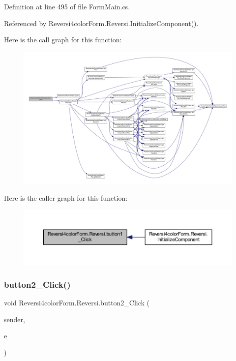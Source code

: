 Definition at line 495 of file Form\+Main.\+cs.



Referenced by Reversi4color\+Form.\+Reversi.\+Initialize\+Component().

Here is the call graph for this function\+:\nopagebreak
\begin{figure}[H]
\begin{center}
\leavevmode
\includegraphics[width=350pt]{class_reversi4color_form_1_1_reversi_a6c7543d2823cf116c55bba3b970e4931_cgraph}
\end{center}
\end{figure}
Here is the caller graph for this function\+:\nopagebreak
\begin{figure}[H]
\begin{center}
\leavevmode
\includegraphics[width=350pt]{class_reversi4color_form_1_1_reversi_a6c7543d2823cf116c55bba3b970e4931_icgraph}
\end{center}
\end{figure}
\mbox{\label{class_reversi4color_form_1_1_reversi_a99a5abaa127633df40da37167d579541}} 
\subsubsection{\texorpdfstring{button2\+\_\+\+Click()}{button2\_Click()}}
{\footnotesize\ttfamily void Reversi4color\+Form.\+Reversi.\+button2\+\_\+\+Click (\begin{DoxyParamCaption}\item[{object}]{sender,  }\item[{Event\+Args}]{e }\end{DoxyParamCaption})\hspace{0.3cm}{\ttfamily [private]}}



